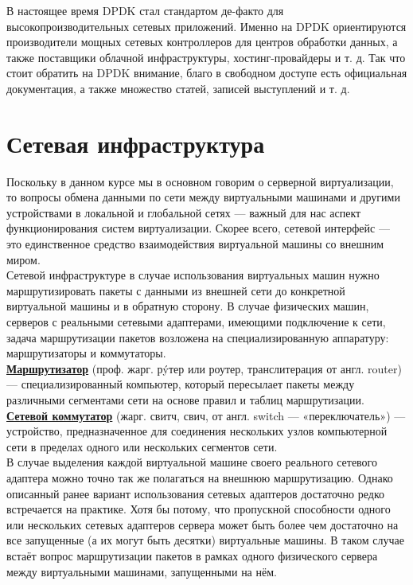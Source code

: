 \documentclass[14pt, a4paper]{article}
\begin{document}
В настоящее время DPDK стал стандартом де-факто для высокопроизводительных сетевых
приложений. Именно на DPDK ориентируются производители мощных сетевых контроллеров для
центров обработки данных, а также поставщики облачной инфраструктуры, хостинг-провайдеры и т. д.
Так что стоит обратить на DPDK внимание, благо в свободном доступе есть официальная
документация, а также множество статей, записей выступлений и т. д.

\section*{Сетевая инфраструктура} 

Поскольку в данном курсе мы в основном говорим о серверной виртуализации, то вопросы обмена
данными по сети между виртуальными машинами и другими устройствами в локальной и глобальной
сетях — важный для нас аспект функционирования систем виртуализации. Скорее всего, сетевой
интерфейс — это единственное средство взаимодействия виртуальной машины со внешним миром.\\

Сетевой инфраструктуре в случае использования виртуальных машин нужно маршрутизировать
пакеты с данными из внешней сети до конкретной виртуальной машины и в обратную сторону. В
случае физических машин, серверов с реальными сетевыми адаптерами, имеющими подключение к
сети, задача маршрутизации пакетов возложена на специализированную аппаратуру:
маршрутизаторы и коммутаторы.\\

\href{https://ru.wikipedia.org/wiki/Маршрутизатор}{\textbf{Маршрутизатор}} (проф. жарг. рýтер или роутер, транслитерация от англ. router) —
специализированный компьютер, который пересылает пакеты между различными сегментами сети на
основе правил и таблиц маршрутизации.\\

\href{https://ru.wikipedia.org/wiki/Сетевой_коммутатор}{\textbf{Сетевой коммутатор}} (жарг. свитч, свич, от англ. switch — «переключатель») — устройство,
предназначенное для соединения нескольких узлов компьютерной сети в пределах одного или
нескольких сегментов сети.\\

В случае выделения каждой виртуальной машине своего реального сетевого адаптера можно точно
так же полагаться на внешнюю маршрутизацию. Однако описанный ранее вариант использования
сетевых адаптеров достаточно редко встречается на практике. Хотя бы потому, что пропускной
способности одного или нескольких сетевых адаптеров сервера может быть более чем достаточно на
все запущенные (а их могут быть десятки) виртуальные машины. В таком случае встаёт вопрос
маршрутизации пакетов в рамках одного физического сервера между виртуальными машинами,
запущенными на нём.\\
\end{document}
